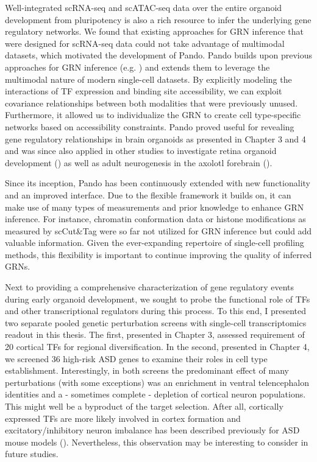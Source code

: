 Well-integrated scRNA-seq and scATAC-seq data over the entire organoid development from pluripotency is also a rich resource to infer the underlying gene regulatory networks. We found that existing approaches for GRN inference that were designed for scRNA-seq data could not take advantage of multimodal datasets, which motivated the development of Pando. Pando builds upon previous approaches for GRN inference (e.g. \cite{aibar_scenic_2017}) and extends them to leverage the multimodal nature of modern single-cell datasets. By explicitly modeling the interactions of TF expression and binding site accessibility, we can exploit covariance relationships between both modalities that were previously unused. Furthermore, it allowed us to individualize the GRN to create cell type-specific networks based on accessibility constraints. Pando proved useful for revealing gene regulatory relationships in brain organoids as presented in Chapter 3 and 4 and was since also applied in other studies to investigate retina organoid development (\cite{wahle_multimodal_2022}) as well as adult neurogenesis in the axolotl forebrain (\cite{lust_single-cell_2022}).

Since its inception, Pando has been continuously extended with new functionality and an improved interface. Due to the flexible framework it builds on, it can make use of many types of measurements and prior knowledge to enhance GRN inference. For instance, chromatin conformation data or histone modifications as measured by scCut\&Tag were so far not utilized for GRN inference but could add valuable information. Given the ever-expanding repertoire of single-cell profiling methods, this flexibility is important to continue improving the quality of inferred GRNs.


Next to providing a comprehensive characterization of gene regulatory events during early organoid development, we sought to probe the functional role of TFs and other transcriptional regulators during this process. To this end, I presented two separate pooled genetic perturbation screens with single-cell transcriptomics readout in this thesis. The first, presented in Chapter 3, assessed requirement of 20 cortical TFs for regional diversification. In the second, presented in Chapter 4, we screened 36 high-risk ASD genes to examine their roles in cell type establishment. Interestingly, in both screens the predominant effect of many perturbations (with some exceptions) was an enrichment in ventral telencephalon identities and a - sometimes complete - depletion of cortical neuron populations. This might well be a byproduct of the target selection. After all, cortically expressed TFs are more likely involved in cortex formation and excitatory/inhibitory neuron imbalance has been described previously for ASD mouse models (\cite{sudhof_neuroligins_2008,nelson_excitatoryinhibitory_2015}). Nevertheless, this observation may be interesting to consider in future studies.

